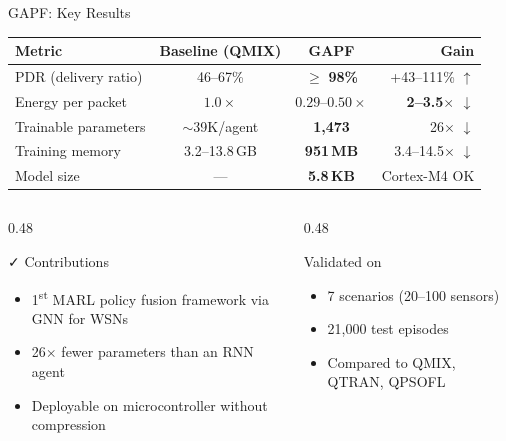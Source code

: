 \documentclass[10pt,aspectratio=169]{beamer}
\begin{document}
\begin{frame}[shrink=8]{GAPF: Key Results}
\centering
\renewcommand{\arraystretch}{1.2}
\begin{tabular}{lccr}
  \toprule
  \textbf{Metric} & \textbf{Baseline (QMIX)} & \textbf{GAPF} & \textbf{Gain} \\
  \midrule
  PDR (delivery ratio) & 46--67\% & $\geq$ \textbf{98\%} & +43--111\% $\uparrow$ \\
  Energy per packet & $1.0\times$ & $0.29$--$0.50\times$ & \textbf{2--3.5$\times$ $\downarrow$} \\
  Trainable parameters & $\sim$39K/agent & \textbf{1,473} & 26$\times$ $\downarrow$ \\
  Training memory & 3.2--13.8\,GB & \textbf{951\,MB} & 3.4--14.5$\times$ $\downarrow$ \\
  Model size & --- & \textbf{5.8\,KB} & Cortex-M4 OK \\
  \bottomrule
\end{tabular}

\vspace{10pt}
\begin{columns}
\begin{column}{0.48\textwidth}
  \begin{exampleblock}{\faCheck\; Contributions}
    \begin{itemize}\small
      \item 1\textsuperscript{st} MARL policy fusion framework via GNN for WSNs
      \item 26$\times$ fewer parameters than an RNN agent
      \item Deployable on microcontroller without compression
    \end{itemize}
  \end{exampleblock}
\end{column}
\begin{column}{0.48\textwidth}
  \begin{block}{Validated on}
    \begin{itemize}\small
      \item 7 scenarios (20--100 sensors)
      \item 21,000 test episodes
      \item Compared to QMIX, QTRAN, QPSOFL
    \end{itemize}
  \end{block}
\end{column}
\end{columns}
\end{frame}
\end{document}
